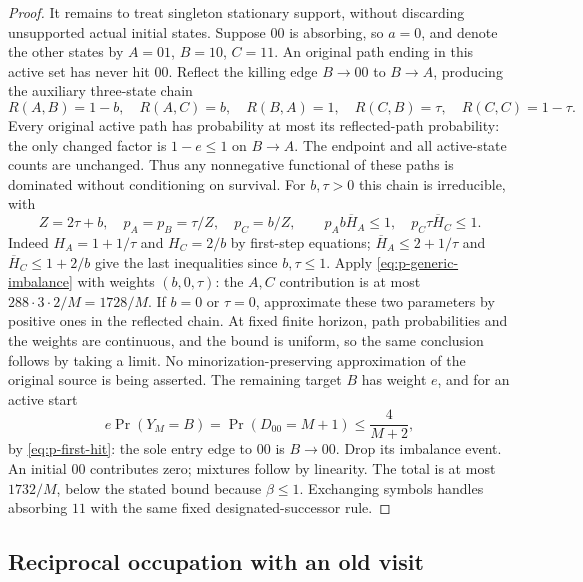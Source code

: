 \begin{proof}
It remains to treat singleton stationary support, without discarding
unsupported actual initial states.  Suppose $00$ is absorbing, so $a=0$,
and denote the other states by $A=01$, $B=10$, $C=11$.
An original path ending in this active set has never hit $00$.
Reflect the killing edge $B\to00$ to $B\to A$, producing the auxiliary
three-state chain
\[
 R(A,B)=1-b,\quad R(A,C)=b,\quad R(B,A)=1,
 \quad R(C,B)=\tau,\quad R(C,C)=1-\tau.
\]
Every original active path has probability at most its reflected-path
probability: the only changed factor is $1-e\le1$ on $B\to A$.
The endpoint and all active-state counts are unchanged.  Thus any
nonnegative functional of these paths is dominated without conditioning
on survival.
For $b,\tau>0$ this chain is irreducible, with
\begin{equation}\label{eq:p-reflected-weights}
 Z=2\tau+b,\quad p_A=p_B=\tau/Z,\quad p_C=b/Z,
 \qquad p_Ab\overline H_A\le1,\quad
 p_C\tau\overline H_C\le1.
\end{equation}
Indeed $H_A=1+1/\tau$ and $H_C=2/b$ by first-step equations;
$\overline H_A\le2+1/\tau$ and
$\overline H_C\le1+2/b$ give the last inequalities since $b,\tau\le1$.
Apply \eqref{eq:p-generic-imbalance} with weights $(b,0,\tau)$:
the $A,C$ contribution is at most $288\cdot3\cdot2/M=1728/M$.
If $b=0$ or $\tau=0$, approximate these two parameters by positive
ones in the reflected chain.  At fixed finite horizon, path probabilities
and the weights are continuous, and the bound is uniform, so the same
conclusion follows by taking a limit.  No minorization-preserving
approximation of the original source is being asserted.
The remaining target $B$ has weight $e$, and for an active start
\begin{equation}\label{eq:p-next-absorption}
 e\Pr(Y_M=B)=\Pr(D_{00}=M+1)\le\frac4{M+2},
\end{equation}
by \eqref{eq:p-first-hit}: the sole entry edge to $00$ is $B\to00$.
Drop its imbalance event.  An initial $00$ contributes zero; mixtures
follow by linearity.  The total is at most $1732/M$, below the stated
bound because $\beta\le1$.  Exchanging symbols handles absorbing $11$
with the same fixed designated-successor rule.
\end{proof}

\subsection{Reciprocal occupation with an old visit}

